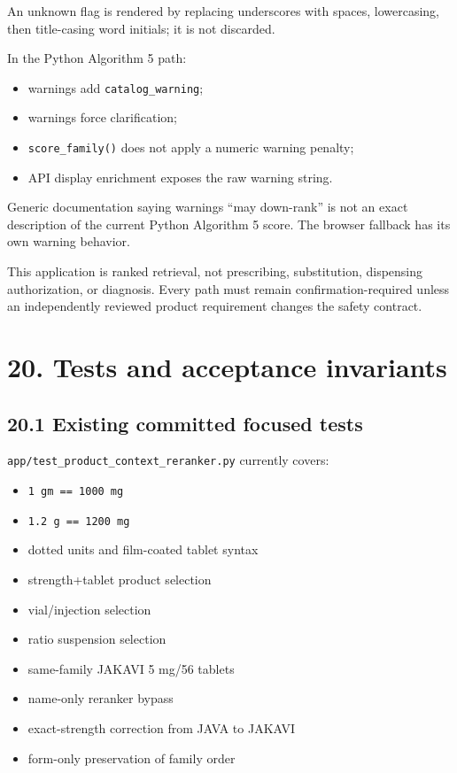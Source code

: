 An unknown flag is rendered by replacing underscores with spaces, lowercasing, then title-casing word initials; it is not discarded.

In the Python Algorithm 5 path:

\begin{itemize}
\tightlist
\item
  warnings add \texttt{catalog\_\allowbreak{}warning};
\item
  warnings force clarification;
\item
  \texttt{score\_\allowbreak{}family()} does not apply a numeric warning penalty;
\item
  API display enrichment exposes the raw warning string.
\end{itemize}

Generic documentation saying warnings ``may down-rank'' is not an exact description of the current Python Algorithm 5 score. The browser fallback has its own warning behavior.

This application is ranked retrieval, not prescribing, substitution, dispensing authorization, or diagnosis. Every path must remain confirmation-required unless an independently reviewed product requirement changes the safety contract.

\section{20. Tests and acceptance invariants}\label{20-tests-and-acceptance-invariants}

\subsection{20.1 Existing committed focused tests}\label{201-existing-committed-focused-tests}

\texttt{app/test\_\allowbreak{}product\_\allowbreak{}context\_\allowbreak{}reranker.py} currently covers:

\begin{itemize}
\tightlist
\item
  \texttt{1\ gm\ ==\ 1000\ mg}
\item
  \texttt{1.2\ g\ ==\ 1200\ mg}
\item
  dotted units and film-coated tablet syntax
\item
  strength+tablet product selection
\item
  vial/injection selection
\item
  ratio suspension selection
\item
  same-family JAKAVI 5 mg/56 tablets
\item
  name-only reranker bypass
\item
  exact-strength correction from JAVA to JAKAVI
\item
  form-only preservation of family order
\end{itemize}

